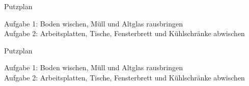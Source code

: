 \documentclass[landscape]{slides}
\newcommand{\aaa}{\color{black}  \seite{}101}
\newcommand{\bbb}{\color{red}    \seite{}102}
\newcommand{\ccc}{\color{olive}  \seite{}103}
\newcommand{\ddd}{\color{violet} \seite{}104}
\newcommand{\eee}{\color{cyan}   \seite{}105}
\newcommand{\fff}{\color{orange} \seite{}106}
\begin{document}
\newcommand{\seite}{R}

\begin{center}
\Large Putzplan
\end{center}


\begin{footnotesize}
    Aufgabe 1: Boden wischen, Müll und Altglas rausbringen \\
    Aufgabe 2: Arbeitsplatten, Tische, Fensterbrett und Kühlschränke abwischen
\end{footnotesize}

\clearpage

\renewcommand{\seite}{S}

\begin{center}
\Large Putzplan
\end{center}


\begin{footnotesize}
    Aufgabe 1: Boden wischen, Müll und Altglas rausbringen \\
    Aufgabe 2: Arbeitsplatten, Tische, Fensterbrett und Kühlschränke abwischen
\end{footnotesize}
\end{document}
